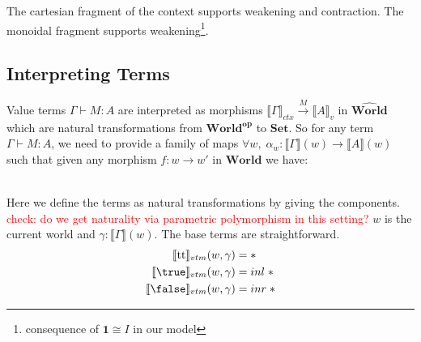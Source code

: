 \documentclass{article}
\newcommand{\red}[1]{\textcolor{red}{#1}}
\newcommand{\ttt}{\textrm{tt}}
\newcommand{\pworld}{\widehat{\mathbf{World}}}
\begin{document}
The cartesian fragment of the context supports weakening and contraction. The monoidal fragment supports weakening\footnote{consequence of $\mathbf{1} \cong I$ in our model}.


\subsection{Interpreting Terms}
Value terms $\Gamma \vdash M : A$ are interpreted as morphisms $\llbracket \Gamma \rrbracket_{ctx} \xrightarrow{M} \llbracket A \rrbracket_{v}$ in $\pworld$ which are natural transformations from $\mathbf{World^{op}}$ to $\mathbf{Set}$. So for any term $\Gamma \vdash M : A$, we need to provide a family of maps $\forall w ,\; \alpha_w : \llbracket \Gamma \rrbracket(w) \rightarrow \llbracket A \rrbracket(w)$ such that given any morphism $f : w \rightarrow w'$ in $\mathbf{World}$ we have:
\begin{figure}[!ht]
    \centering

\end{figure}\\
Here we define the terms as natural transformations by giving the components. \red{check: do we get naturality via parametric polymorphism in this setting?} $w$ is the current world and $\gamma : \llbracket \Gamma \rrbracket(w)$. The base terms are straightforward. 
\begin{align*}
    \llbracket  \ttt \rrbracket_{vtm}(w, \gamma) &= *\\
    \llbracket  \true \rrbracket_{vtm}(w,\gamma) &= inl \;*\\
    \llbracket  \false \rrbracket_{vtm}(w,\gamma) &= inr \;*\\
\end{align*}
\end{document}
